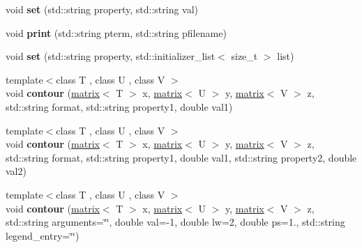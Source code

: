 \begin{DoxyCompactItemize}
\item 
\hypertarget{classkeycpp_1_1_figure_a1f6c04d0276c0419c3feb974639fb7c2}{void {\bfseries set} (std\-::string property, std\-::string val)}\label{classkeycpp_1_1_figure_a1f6c04d0276c0419c3feb974639fb7c2}

\item 
\hypertarget{classkeycpp_1_1_figure_ac6d1881c6dc996eb508adf2126905d38}{void {\bfseries print} (std\-::string pterm, std\-::string pfilename)}\label{classkeycpp_1_1_figure_ac6d1881c6dc996eb508adf2126905d38}

\item 
\hypertarget{classkeycpp_1_1_figure_abceb69bfb4476f2c9423f248bc04a6c8}{void {\bfseries set} (std\-::string property, std\-::initializer\-\_\-list$<$ size\-\_\-t $>$ list)}\label{classkeycpp_1_1_figure_abceb69bfb4476f2c9423f248bc04a6c8}

\item 
\hypertarget{classkeycpp_1_1_figure_a69eac09d43996494856bb9f8c3e80bb9}{{\footnotesize template$<$class T , class U , class V $>$ }\\void {\bfseries contour} (\hyperlink{classkeycpp_1_1matrix}{matrix}$<$ T $>$ x, \hyperlink{classkeycpp_1_1matrix}{matrix}$<$ U $>$ y, \hyperlink{classkeycpp_1_1matrix}{matrix}$<$ V $>$ z, std\-::string format, std\-::string property1, double val1)}\label{classkeycpp_1_1_figure_a69eac09d43996494856bb9f8c3e80bb9}

\item 
\hypertarget{classkeycpp_1_1_figure_afca5a6afa9fade03b67ab4c214543dc7}{{\footnotesize template$<$class T , class U , class V $>$ }\\void {\bfseries contour} (\hyperlink{classkeycpp_1_1matrix}{matrix}$<$ T $>$ x, \hyperlink{classkeycpp_1_1matrix}{matrix}$<$ U $>$ y, \hyperlink{classkeycpp_1_1matrix}{matrix}$<$ V $>$ z, std\-::string format, std\-::string property1, double val1, std\-::string property2, double val2)}\label{classkeycpp_1_1_figure_afca5a6afa9fade03b67ab4c214543dc7}

\item 
\hypertarget{classkeycpp_1_1_figure_ae0b1affd04f645714f2b4cc5698023b5}{{\footnotesize template$<$class T , class U , class V $>$ }\\void {\bfseries contour} (\hyperlink{classkeycpp_1_1matrix}{matrix}$<$ T $>$ x, \hyperlink{classkeycpp_1_1matrix}{matrix}$<$ U $>$ y, \hyperlink{classkeycpp_1_1matrix}{matrix}$<$ V $>$ z, std\-::string arguments=\char`\"{}\char`\"{}, double val=-\/1, double lw=2, double ps=1., std\-::string legend\-\_\-entry=\char`\"{}\char`\"{})}\label{classkeycpp_1_1_figure_ae0b1affd04f645714f2b4cc5698023b5}


\end{DoxyCompactItemize}
